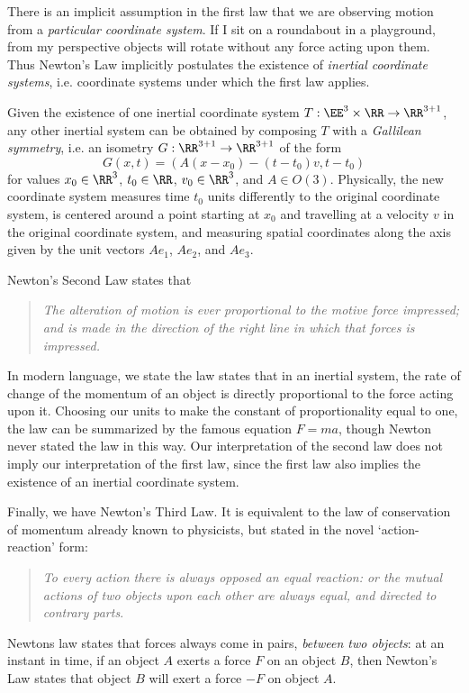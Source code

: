 There is an implicit assumption in the first law that we are observing motion from a \emph{particular coordinate system}. If I sit on a roundabout in a playground, from my perspective objects will rotate without any force acting upon them. Thus Newton's Law implicitly postulates the existence of \emph{inertial coordinate systems}, i.e. coordinate systems under which the first law applies.

Given the existence of one inertial coordinate system $T:\EE^3 \times \RR \to \RR^{3+1}$, any other inertial system can be obtained by composing $T$ with a \emph{Gallilean symmetry}, i.e. an isometry $G: \RR^{3+1} \to \RR^{3+1}$ of the form
%
\[ G(x,t) = ( A(x - x_0) - (t - t_0) v, t - t_0 ) \]
% 
for values $x_0 \in \RR^3$, $t_0 \in \RR$, $v_0 \in \RR^3$, and $A \in O(3)$. Physically, the new coordinate system measures time $t_0$ units differently to the original coordinate system, is centered around a point starting at $x_0$ and travelling at a velocity $v$ in the original coordinate system, and measuring spatial coordinates along the axis given by the unit vectors $Ae_1$, $Ae_2$, and $Ae_3$.

Newton's Second Law states that
%
\begin{quote}
    \emph{The alteration of motion is ever proportional to the motive force impressed; and is made in the direction of the right line in which that forces is impressed.}
\end{quote}
%
In modern language, we state the law states that in an inertial system, the rate of change of the momentum of an object is directly proportional to the force acting upon it. Choosing our units to make the constant of proportionality equal to one, the law can be summarized by the famous equation $F = ma$, though Newton never stated the law in this way. Our interpretation of the second law does not imply our interpretation of the first law, since the first law also implies the existence of an inertial coordinate system.

Finally, we have Newton's Third Law. It is equivalent to the law of conservation of momentum already known to physicists, but stated in the novel `action-reaction' form:
%
\begin{quote}
    \emph{To every action there is always opposed an equal reaction: or the mutual actions of two objects upon each other are always equal, and directed to contrary parts}.
\end{quote}
%
Newtons law states that forces always come in pairs, \emph{between two objects}: at an instant in time, if an object $A$ exerts a force $F$ on an object $B$, then Newton's Law states that object $B$ will exert a force $-F$ on object $A$.

